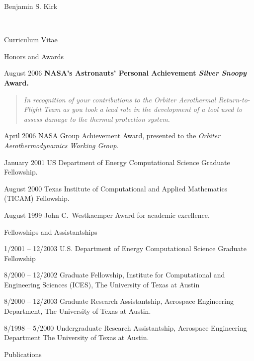 \documentclass[10pt]{report}
\begin{document}
\begin{cv}{\centerline{\Large Benjamin S. Kirk}\\
    \centerline{\large Curriculum Vitae}}
\begin{cvlist}{Honors and Awards}
    \item[August 2006]
      \textbf{NASA's Astronauts' Personal Achievement {\em Silver Snoopy} Award.}

      \begin{quote}
        \em In recognition of your contributions to the Orbiter Aerothermal Return-to-Flight Team as you took a lead role in the development of a tool used to assess damage to the thermal protection system.
      \end{quote}

    \item[April 2006]
      NASA Group Achievement Award, presented to the {\em Orbiter Aerothermodynamics Working Group}.

    \item[January 2001]
      US Department of Energy Computational Science Graduate Fellowship.

    \item[August 2000]
      Texas Institute of Computational and Applied Mathematics (TICAM) Fellowship.

    \item[August 1999]
      John C.\ Westkaemper Award for academic excellence.
  \end{cvlist}


  \begin{cvlist}{Fellowships and Assistantships}
    \item[1/2001 -- 12/2003]
      U.S. Department of Energy Computational Science Graduate Fellowship
    \item[8/2000 -- 12/2002]
      Graduate Fellowship,
      Institute for Computational and Engineering Sciences (ICES),
      The University of Texas at Austin
    \item[8/2000 -- 12/2003]
      Graduate Research Assistantship,
      Aerospace Engineering Department,
      The University of Texas at Austin.
    \item[8/1998 -- 5/2000]
      Undergraduate Research Assistantship,
      Aerospace Engineering Department
      The University of Texas at Austin.
  \end{cvlist}


  \begin{cvlist}{Publications}


\end{cvlist}
\end{cv}
\end{document}
